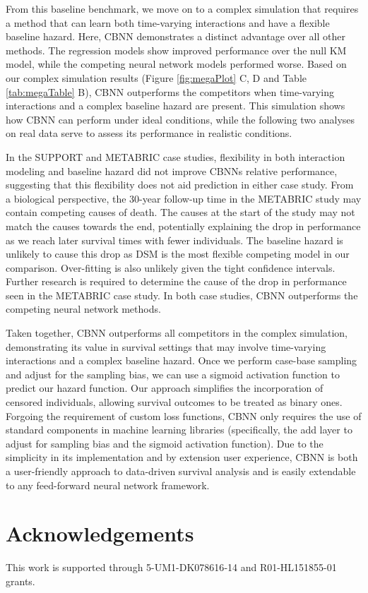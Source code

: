 \documentclass[AMA,STIX1COL,]{WileyNJD-v2}
\begin{document}
From this baseline benchmark, we move on to a complex simulation that
requires a method that can learn both time-varying interactions and have
a flexible baseline hazard. Here, CBNN demonstrates a distinct advantage
over all other methods. The regression models show improved performance
over the null KM model, while the competing neural network models
performed worse. Based on our complex simulation results (Figure
\ref{fig:megaPlot} C, D and Table \ref{tab:megaTable} B), CBNN
outperforms the competitors when time-varying interactions and a complex
baseline hazard are present. This simulation shows how CBNN can perform
under ideal conditions, while the following two analyses on real data
serve to assess its performance in realistic conditions.

In the SUPPORT and METABRIC case studies, flexibility in both
interaction modeling and baseline hazard did not improve CBNNs relative
performance, suggesting that this flexibility does not aid prediction in
either case study. From a biological perspective, the 30-year follow-up
time in the METABRIC study may contain competing causes of death. The
causes at the start of the study may not match the causes towards the
end, potentially explaining the drop in performance as we reach later
survival times with fewer individuals. The baseline hazard is unlikely
to cause this drop as DSM is the most flexible competing model in our
comparison. Over-fitting is also unlikely given the tight confidence
intervals. Further research is required to determine the cause of the
drop in performance seen in the METABRIC case study. In both case
studies, CBNN outperforms the competing neural network methods.

Taken together, CBNN outperforms all competitors in the complex
simulation, demonstrating its value in survival settings that may
involve time-varying interactions and a complex baseline hazard. Once we
perform case-base sampling and adjust for the sampling bias, we can use
a sigmoid activation function to predict our hazard function. Our
approach simplifies the incorporation of censored individuals, allowing
survival outcomes to be treated as binary ones. Forgoing the requirement
of custom loss functions, CBNN only requires the use of standard
components in machine learning libraries (specifically, the add layer to
adjust for sampling bias and the sigmoid activation function). Due to
the simplicity in its implementation and by extension user experience,
CBNN is both a user-friendly approach to data-driven survival analysis
and is easily extendable to any feed-forward neural network framework.

\hypertarget{acknowledgements}{%
\section*{Acknowledgements}\label{acknowledgements}}

This work is supported through 5-UM1-DK078616‐14 and R01-HL151855-01
grants.


\end{document}
